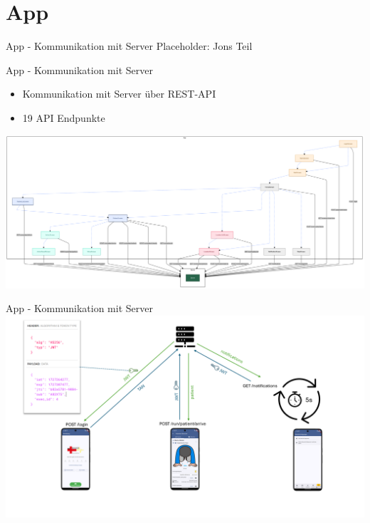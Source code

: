 %
%
\section{App}

\begin{frame}{App - Kommunikation mit Server}
	Placeholder: Jons Teil
\end{frame}

\begin{frame}{App - Kommunikation mit Server}
	\begin{itemize}
		\item Kommunikation mit Server über REST-API
		\item 19 API Endpunkte
	\end{itemize}
	\centering
	\includegraphics[width=1.0\textwidth]{images/app/server_endpoints.png}
\end{frame}

\begin{frame}{App - Kommunikation mit Server}
	\centering
	\includegraphics[width=1.0\textwidth]{images/app/api_flow.png}
\end{frame}

